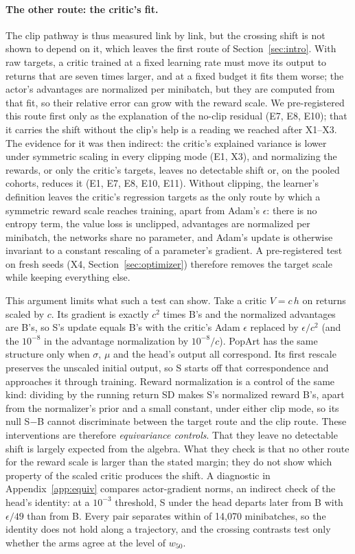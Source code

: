 \paragraph{The other route: the critic's fit.}
The clip pathway is thus measured link by link, but the crossing shift is not shown to depend on it, which leaves the first route
of Section~\ref{sec:intro}. With raw targets, a critic trained at a fixed learning rate must move its output to returns
that are seven times larger, and at a fixed budget it fits them worse; the actor's advantages are normalized per
minibatch, but they are computed from that fit, so their relative error can grow with the reward scale. We
pre-registered this route first only as the explanation of the no-clip residual (E7, E8, E10); that it carries the shift
without the clip's help is a reading we reached after X1--X3. The evidence for it was then indirect: the critic's explained variance is lower under
symmetric scaling in every clipping mode (E1, X3), and normalizing the rewards, or only the critic's targets, leaves no
detectable shift or, on the pooled cohorts, reduces it (E1, E7, E8, E10, E11). Without clipping, the learner's definition
leaves the critic's regression targets as the only route by which a symmetric reward scale reaches training, apart from
Adam's $\epsilon$: there is no entropy term, the value loss is unclipped, advantages are normalized per minibatch, the
networks share no parameter, and Adam's update is otherwise invariant to a constant rescaling of a parameter's gradient. A pre-registered test on fresh seeds (X4, Section~\ref{sec:optimizer}) therefore
removes the target scale while keeping everything else.

This argument limits what such a test can show. Take a critic $V=c\,h$ on returns scaled by $c$. Its gradient is exactly
$c^2$ times B's and the normalized advantages are B's, so S's update equals B's with the critic's Adam $\epsilon$ replaced by
$\epsilon/c^2$ (and the $10^{-8}$ in the advantage normalization by $10^{-8}/c$). PopArt has the same structure only when $\sigma$, $\mu$ and the head's output all correspond. Its first rescale
preserves the unscaled initial output, so S starts off that correspondence and approaches it through training.
Reward normalization is a control of the same kind: dividing by the running return SD makes S's normalized reward B's,
apart from the normalizer's prior and a small constant, under either clip mode, so its null S$-$B cannot discriminate
between the target route and the clip route. These interventions are therefore \emph{equivariance controls}. That they
leave no detectable shift is largely expected from the algebra. What they check is that no other route for the reward
scale is larger than the stated margin; they do not show which property of the scaled critic produces the shift. A
diagnostic in Appendix~\ref{app:equiv} compares actor-gradient norms, an indirect check of the head's identity: at a
$10^{-3}$ threshold, S under the head departs later from B with $\epsilon/49$ than from B. Every pair separates within
\VeqvLastDiv{} of 14,070 minibatches, so the identity does not hold along a trajectory, and the crossing contrasts test
only whether the arms agree at the level of $w_{50}$.

